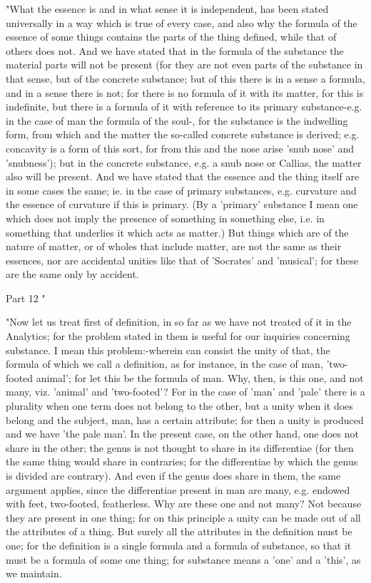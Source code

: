 "What the essence is and in what sense it is independent, has been
stated universally in a way which is true of every case, and also
why the formula of the essence of some things contains the parts of
the thing defined, while that of others does not. And we have stated
that in the formula of the substance the material parts will not be
present (for they are not even parts of the substance in that sense,
but of the concrete substance; but of this there is in a sense a formula,
and in a sense there is not; for there is no formula of it with its
matter, for this is indefinite, but there is a formula of it with
reference to its primary substance-e.g. in the case of man the formula
of the soul-, for the substance is the indwelling form, from which
and the matter the so-called concrete substance is derived; e.g. concavity
is a form of this sort, for from this and the nose arise 'snub nose'
and 'snubness'); but in the concrete substance, e.g. a snub nose or
Callias, the matter also will be present. And we have stated that
the essence and the thing itself are in some cases the same; ie. in
the case of primary substances, e.g. curvature and the essence of
curvature if this is primary. (By a 'primary' substance I mean one
which does not imply the presence of something in something else,
i.e. in something that underlies it which acts as matter.) But things
which are of the nature of matter, or of wholes that include matter,
are not the same as their essences, nor are accidental unities like
that of 'Socrates' and 'musical'; for these are the same only by accident.

Part 12 "

"Now let us treat first of definition, in so far as we have not treated
of it in the Analytics; for the problem stated in them is useful for
our inquiries concerning substance. I mean this problem:-wherein can
consist the unity of that, the formula of which we call a definition,
as for instance, in the case of man, 'two-footed animal'; for let
this be the formula of man. Why, then, is this one, and not many,
viz. 'animal' and 'two-footed'? For in the case of 'man' and 'pale'
there is a plurality when one term does not belong to the other, but
a unity when it does belong and the subject, man, has a certain attribute;
for then a unity is produced and we have 'the pale man'. In the present
case, on the other hand, one does not share in the other; the genus
is not thought to share in its differentiae (for then the same thing
would share in contraries; for the differentiae by which the genus
is divided are contrary). And even if the genus does share in them,
the same argument applies, since the differentiae present in man are
many, e.g. endowed with feet, two-footed, featherless. Why are these
one and not many? Not because they are present in one thing; for on
this principle a unity can be made out of all the attributes of a
thing. But surely all the attributes in the definition must be one;
for the definition is a single formula and a formula of substance,
so that it must be a formula of some one thing; for substance means
a 'one' and a 'this', as we maintain. 

